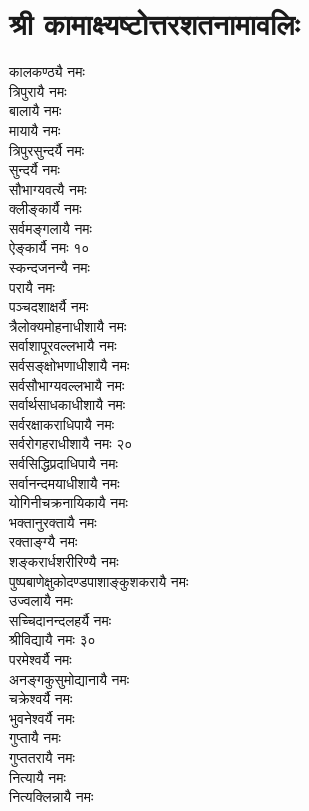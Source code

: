\section{श्री कामाक्ष्यष्टोत्तरशतनामावलिः}
\begin{multicols}{2}
कालकण्ठ्यै नमः\\
त्रिपुरायै नमः\\
बालायै नमः\\
मायायै नमः\\
त्रिपुरसुन्दर्यै नमः\\
सुन्दर्यै नमः\\
सौभाग्यवत्यै नमः\\
क्लीङ्कार्यै नमः\\
सर्वमङ्गलायै नमः\\
ऐङ्कार्यै नमः \hfill १०\\
स्कन्दजनन्यै नमः\\
परायै नमः\\
पञ्चदशाक्षर्यै नमः\\
त्रैलोक्यमोहनाधी\-शायै नमः\\
सर्वाशापूरवल्लभायै नमः\\
सर्वसङ्क्षोभणाधीशायै नमः\\
सर्वसौभाग्यवल्लभायै नमः\\
सर्वार्थसाधकाधीशायै नमः\\
सर्वरक्षाकराधिपायै नमः\\
सर्वरोगहराधीशायै नमः \hfill २०\\
सर्वसिद्धिप्रदाधिपायै नमः\\
सर्वानन्दमयाधीशायै नमः\\
योगिनीचक्रनायिकायै नमः\\
भक्तानुरक्तायै नमः\\
रक्ताङ्ग्यै नमः\\
शङ्करार्धशरीरिण्यै नमः\\
पुष्पबाणेक्षु\-कोदण्ड\-पाशा\-ङ्कुश\-करायै नमः\\
उज्वलायै नमः\\
सच्चिदानन्दलहर्यै नमः\\
श्रीविद्यायै नमः \hfill ३०\\
परमेश्वर्यै नमः\\
अनङ्गकुसुमोद्यानायै नमः\\
चक्रेश्वर्यै नमः\\
भुवनेश्वर्यै नमः\\
गुप्तायै नमः\\
गुप्ततरायै नमः\\
नित्यायै नमः\\
नित्यक्लिन्नायै नमः\\

\end{multicols}
